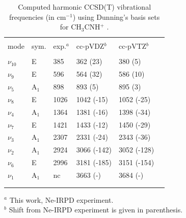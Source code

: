 \documentclass[preprint,12pt]{elsarticle}
\newcommand{\wn}{cm$^{-1}$}
\newcommand{\pa}{CH$_3$CNH$^+$ }
\begin{document}
\begin{table}[h]
\caption{Computed harmonic CCSD(T) vibrational frequencies (in \wn) using Dunning's basis sets for \pa. }
\begin{center}
    \begin{tabular}{llllll} \hline\hline\\
       mode         & sym.  & exp.$^a$  & cc-pVDZ$^b$ & cc-pVTZ$^b$ \\\hline\\
       $\nu_{10}$   & E	    & 385       & 362  (23)	  & 380  (5)    \\
       $\nu_9$      & E	    & 596       & 564  (32)	  & 586  (10)   \\
       $\nu_5$      & A$_1$	& 898       & 893  (5)	  & 895  (3)    \\
       $\nu_8$\     & E	    & 1026      & 1042 (-15)  & 1052 (-25)  \\
       $\nu_4$      & A$_1$	& 1364      & 1381 (-16)  & 1398 (-34)  \\
       $\nu_7$      & E	    & 1421      & 1433 (-12)  & 1450 (-29)  \\
       $\nu_3$      & A$_1$	& 2307      & 2331 (-24)  & 2343 (-36)  \\
       $\nu_2$      & A$_1$	& 2924      & 3066 (-142) & 3052 (-128) \\
       $\nu_6$      & E	    & 2996      & 3181 (-185) & 3151 (-154) \\
       $\nu_1$      & A$_1$	& nc        & 3663 (-)	  & 3684 (-)    \\
        \\
        \hline\hline\\
    \end{tabular}
    
    $^a$ This work, Ne-IRPD experiment.\\
    $^b$ Shift from Ne-IRPD experiment is given in parenthesis.
\end{center}

\end{table}
\end{document}
